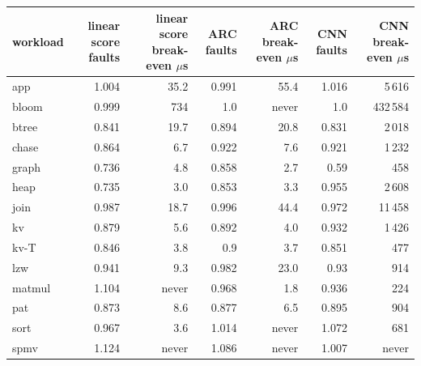\begin{tabular}{lrrrrrr}
\toprule
workload & linear score faults & linear score break-even $\mu$s & ARC faults & ARC break-even $\mu$s & CNN faults & CNN break-even $\mu$s \\
\midrule
app & 1.004 & 35.2 & 0.991 & 55.4 & 1.016 & 5\,616 \\
bloom & 0.999 & 734 & 1.0 & never & 1.0 & 432\,584 \\
btree & 0.841 & 19.7 & 0.894 & 20.8 & 0.831 & 2\,018 \\
chase & 0.864 & 6.7 & 0.922 & 7.6 & 0.921 & 1\,232 \\
graph & 0.736 & 4.8 & 0.858 & 2.7 & 0.59 & 458 \\
heap & 0.735 & 3.0 & 0.853 & 3.3 & 0.955 & 2\,608 \\
join & 0.987 & 18.7 & 0.996 & 44.4 & 0.972 & 11\,458 \\
kv & 0.879 & 5.6 & 0.892 & 4.0 & 0.932 & 1\,426 \\
kv-T & 0.846 & 3.8 & 0.9 & 3.7 & 0.851 & 477 \\
lzw & 0.941 & 9.3 & 0.982 & 23.0 & 0.93 & 914 \\
matmul & 1.104 & never & 0.968 & 1.8 & 0.936 & 224 \\
pat & 0.873 & 8.6 & 0.877 & 6.5 & 0.895 & 904 \\
sort & 0.967 & 3.6 & 1.014 & never & 1.072 & 681 \\
spmv & 1.124 & never & 1.086 & never & 1.007 & never \\
\bottomrule
\end{tabular}
